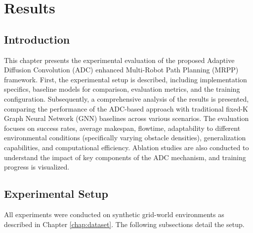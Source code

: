 \chapter{Results}
\label{chap:results}

\section{Introduction}
This chapter presents the experimental evaluation of the proposed Adaptive Diffusion Convolution (ADC) enhanced Multi-Robot Path Planning (MRPP) framework. First, the experimental setup is described, including implementation specifics, baseline models for comparison, evaluation metrics, and the training configuration. Subsequently, a comprehensive analysis of the results is presented, comparing the performance of the ADC-based approach with traditional fixed-K Graph Neural Network (GNN) baselines across various scenarios. The evaluation focuses on success rates, average makespan, flowtime, adaptability to different environmental conditions (specifically varying obstacle densities), generalization capabilities, and computational efficiency. Ablation studies are also conducted to understand the impact of key components of the ADC mechanism, and training progress is visualized.

\section{Experimental Setup}
\label{sec:exp_setup}

All experiments were conducted on synthetic grid-world environments as described in Chapter \ref{chap:dataset}. The following subsections detail the setup.

